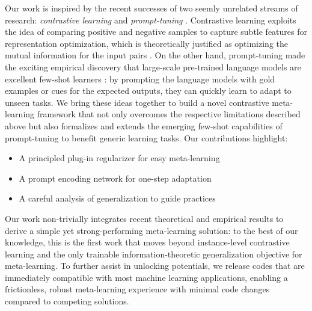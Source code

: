 \documentclass[nohyperref]{article}
\theoremstyle{plain}
\theoremstyle{definition}
\theoremstyle{remark}
\begin{document}
Our work is inspired by the recent successes of two seemly unrelated streams of research: {\it contrastive learning} \citep{oord2018representation, chen2020simple} and {\it prompt-tuning} \citep{sanh2021multitask}. Contrastive learning exploits the idea of comparing positive and negative samples to capture subtle features for representation optimization, which is theoretically justified as optimizing the mutual information for the input pairs \citep{poole2019variational, guo2021tight}. On the other hand, prompt-tuning made the exciting empirical discovery that large-scale pre-trained language models are excellent few-shot learners \citep{liu2021pre}: by prompting the language models with gold examples or cues for the expected outputs, they can quickly learn to adapt to unseen tasks. We bring these ideas together to build a novel contrastive meta-learning framework that not only overcomes the respective limitations described above but also formalizes and extends the emerging few-shot capabilities of prompt-tuning to benefit generic learning tasks. Our contributions highlight:
\begin{itemize}
\setlength\itemsep{0pt}
\item A principled plug-in regularizer for easy meta-learning
\item A prompt encoding network for one-step adaptation
\item A careful analysis of generalization to guide practices
\end{itemize}
Our work non-trivially integrates recent theoretical and empirical results to derive a simple yet strong-performing meta-learning solution: to the best of our knowledge, this is the first work that moves beyond instance-level contrastive learning and the only trainable information-theoretic generalization objective for meta-learning. To further assist in unlocking potentials, we release codes that are immediately compatible with most machine learning applications, enabling a frictionless, robust meta-learning experience with minimal code changes compared to competing solutions. 
\end{document}
